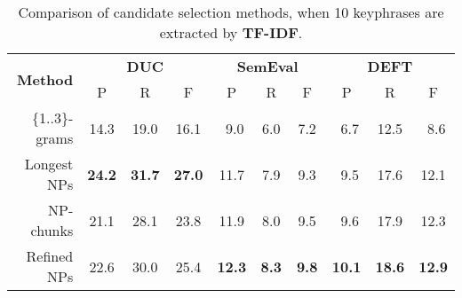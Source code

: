       \begin{table}
        \centering
        \begin{tabular}{rccccccccc}
          \toprule
          \multirow{2}{*}[-2pt]{\textbf{Method}} & \multicolumn{3}{c}{\textbf{DUC}} & \multicolumn{3}{c}{\textbf{SemEval}} & \multicolumn{3}{c}{\textbf{DEFT}}\\
          \cmidrule(r){2-4}\cmidrule(lr){5-7}\cmidrule(l){8-10}
          & P & R & F & P & R & F & P & R & F\\
          \midrule
          \{1..3\}-grams & 14.3 & 19.0 & 16.1 & $~~$9.0 & $~~$6.0 & $~~$7.2 & $~~$6.7 & 12.5 & $~~$8.6\\
          Longest NPs & \textbf{24.2} & \textbf{31.7} & \textbf{27.0} & 11.7 & $~~$7.9 & $~~$9.3 & $~~$9.5 & 17.6 & 12.1\\
          NP-chunks & 21.1 & 28.1 & 23.8 & 11.9 & $~~$8.0 & $~~$9.5 & $~~$9.6 & 17.9 & 12.3\\
          Refined NPs & 22.6 & 30.0 & 25.4 & \textbf{12.3} & \textbf{$~~$8.3} &
     \textbf{$~~$9.8} & \textbf{10.1} & \textbf{18.6} & \textbf{12.9}\\
          \bottomrule
        \end{tabular}
        \caption{Comparison of candidate selection methods, when 10 keyphrases
                 are extracted by \textbf{TF-IDF}.
                 \label{tab:tfidf_results}}
      \end{table}
